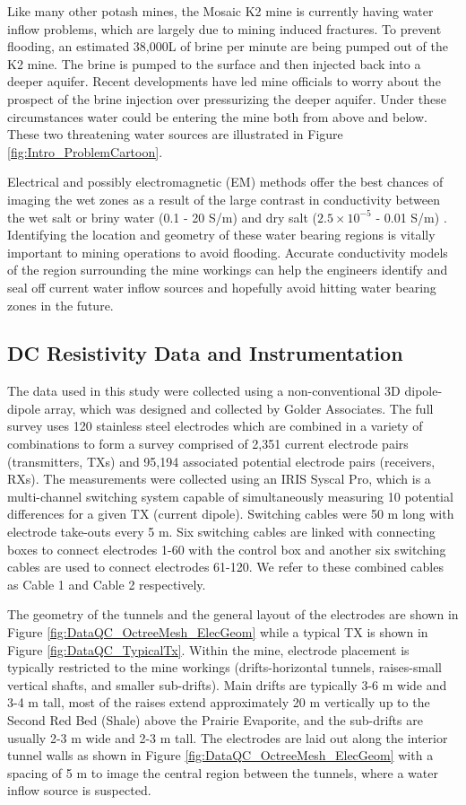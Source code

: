 \documentclass[final,authoryear,5p,times,twocolumn]{elsarticle}
\begin{document}
Like many other potash mines, the Mosaic K2 mine is currently having water inflow problems, which are largely due to mining induced fractures. To prevent flooding, an estimated 38,000L of brine per minute are being pumped out of the K2 mine. The brine is pumped to the surface and then injected back into a deeper aquifer. Recent developments have led mine officials to worry about the prospect of the brine injection over pressurizing the deeper aquifer. Under these circumstances water could be entering the mine both from above and below. These two threatening water sources are illustrated in Figure \ref{fig:Intro_ProblemCartoon}.

Electrical and possibly electromagnetic (EM) methods offer the best chances of imaging the wet zones as a result of the large contrast in conductivity between the wet salt or briny water (0.1 - 20 S/m) and dry salt ($2.5 \times 10^{-5}$ - 0.01 S/m) \citep{Duckworth1992, Chouteau1997}. Identifying the location and geometry of these water bearing regions is vitally important to mining operations to avoid flooding. Accurate conductivity models of the region surrounding the mine workings can help the engineers identify and seal off current water inflow sources and hopefully avoid hitting water bearing zones in the future.

\subsection{DC Resistivity Data and Instrumentation}
\label{CaseStudy:Data_Instrumentation}
The data used in this study were collected using a non-conventional 3D dipole-dipole array, which was designed and collected by Golder Associates. The full survey uses 120 stainless steel electrodes which are combined in a variety of combinations to form a survey comprised of 2,351 current electrode pairs (transmitters, TXs) and 95,194 associated potential electrode pairs (receivers, RXs). The measurements were collected using an IRIS Syscal Pro, which is a multi-channel switching system capable of simultaneously measuring 10 potential differences for a given TX (current dipole). Switching cables were 50 m long with electrode take-outs every 5 m. Six switching cables are linked with connecting boxes to connect electrodes 1-60 with the control box and another six switching cables are used to connect electrodes 61-120. We refer to these combined cables as Cable 1 and Cable 2 respectively.

The geometry of the tunnels and the general layout of the electrodes are shown in Figure \ref{fig:DataQC_OctreeMesh_ElecGeom} while a typical TX is shown in Figure \ref{fig:DataQC_TypicalTx}. Within the mine, electrode placement is typically restricted to the mine workings (drifts-horizontal tunnels, raises-small vertical shafts, and smaller sub-drifts). Main drifts are typically 3-6 m wide and 3-4 m tall, most of the raises extend approximately 20 m vertically up to the Second Red Bed (Shale) above the Prairie Evaporite, and the sub-drifts are usually 2-3 m wide and 2-3 m tall. The electrodes are laid out along the interior tunnel walls as shown in Figure \ref{fig:DataQC_OctreeMesh_ElecGeom} with a spacing of 5 m to image the central region between the tunnels, where a water inflow source is suspected.
\end{document}

